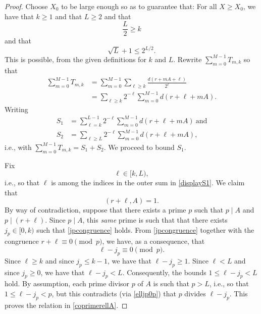 \documentclass[12pt]{article}
\begin{document}
\begin{proof}
 Choose $X_0$ to be large enough so as to guarantee that: For all $X \geq X_0$, we have that $k \geq 1$ and that $L \geq 2$ and that 
\begin{equation}\label{Lhalfk} 
 \frac{L}{2} \geq k 
\end{equation} 
and that 
\begin{equation}\label{sqrtLpower} 
 \sqrt{L} + 1 \leq 2^{L/2}.
\end{equation}
 This is possible, from the given definitions for $k$ and $L$. Rewrite $\sum_{m=0}^{M-1} T_{m, k}$ so that 
\begin{align*}
 \sum_{m=0}^{M-1} T_{m, k}
 & = \sum_{m=0}^{M-1} \sum_{\ell \geq k} \frac{d(r + m A + \ell)}{2^{\ell}} \\
 & = \sum_{\ell \geq k} 2^{-\ell} \sum_{m=0}^{M-1} d(r + \ell + m A). 
\end{align*}
 Writing 
\begin{align}
 S_1 & = \sum_{\ell = k}^{L-1} 2^{-\ell} \sum_{m=0}^{M-1} d(r + \ell + m A) \ \text{and} \label{displayS1} \\ 
 S_{2} & = \sum_{\ell \geq L} 2^{-\ell} \sum_{m=0}^{M-1} d(r + \ell + m A), \label{displayS2}
\end{align}
 i.e., with $ \sum_{m=0}^{M-1} T_{m, k} = S_{1} + S_{2}$. We proceed to bound $S_{1}$. 

 Fix 
\begin{equation}\label{ellkL}
 \ell \in [k, L), 
\end{equation}
 i.e., so that $\ell$ is among the indices in the outer sum in \eqref{displayS1}. We claim that 
\begin{equation}\label{coprimerellA}
 (r + \ell, A) = 1. 
\end{equation} 
 By way of contradiction, suppose that there exists a prime $p$ such that $p \mid A$ and $p \mid (r + \ell)$. Since $p \mid A$, this 
 \emph{same} prime is such that that there exists $j_p \in [0, k)$ such that \eqref{jpcongruence} holds. From \eqref{jpcongruence} 
 together with the congruence $ r + \ell \equiv 0 \pmod p$, we have, as a consequence, that 
\begin{equation}\label{elljp0p} 
 \ell - j_p \equiv 0 \pmod p. 
\end{equation}
 Since $\ell \geq k$ and since $j_p \leq k -1$, we have that $\ell - j_p \geq 1$. Since $\ell < L$ and since $j_p \geq 0$, we have that 
 $\ell - j_p < L$. Consequently, 
 the bounds $1 \leq \ell - j_p < L$ hold. By assumption, each prime divisor $p$ of $A$ is such that $p 
 > L$, i.e., so that $1 \leq \ell - j_p < p$, but this contradicts (via \eqref{elljp0p})
 that $p$ divides $\ell - j_p$. 
 This proves the relation in \eqref{coprimerellA}. 


\end{proof}
\end{document}
